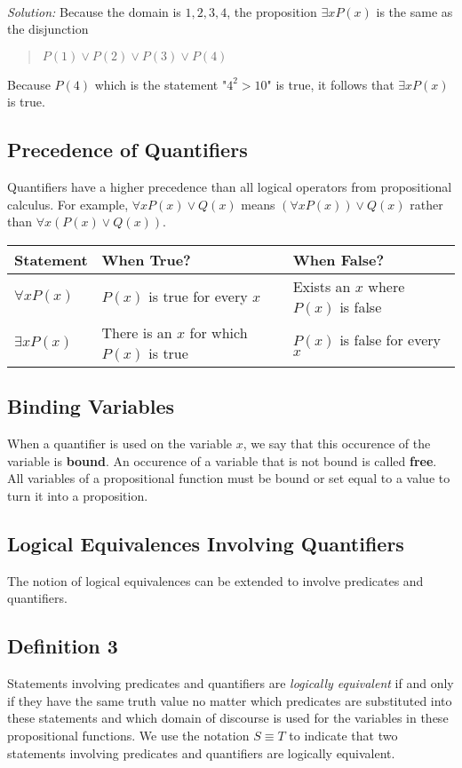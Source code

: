 \documentclass{article}
\begin{document}
\noindent \\ \textit{Solution:} Because the domain is ${1,2,3,4}$, the proposition $\exists xP(x)$ is the same as the disjunction
\begin{quote}
	$P(1) \vee P(2) \vee P(3) \vee P(4)$
\end{quote}

\noindent Because $P(4)$ which is the statement "$4^2 > 10$" is true, it follows that $\exists xP(x)$ is true.

\subsection*{Precedence of Quantifiers}
Quantifiers have a higher precedence than all logical operators from propositional calculus. For example, $\forall xP(x) \vee Q(x)$ means
$(\forall xP(x)) \vee Q(x)$ rather than $\forall x(P(x) \vee Q(x))$.

\begin{center}
	\begin{tabular}{|l|l|l|}
		\hline
		Statement       & When True?                               & When False?                         \\
		\hline
		$\forall xP(x)$ & $P(x)$ is true for every $x$             & Exists an $x$ where $P(x)$ is false \\
		\hline
		$\exists xP(x)$ & There is an $x$ for which $P(x)$ is true & $P(x)$ is false for every $x$       \\
		\hline
	\end{tabular}
\end{center}

\subsection{Binding Variables}
When a quantifier is used on the variable $x$, we say that this occurence of the variable is \textbf{bound}.
An occurence of a variable that is not bound is called \textbf{free}. All variables of a propositional function must be
bound or set equal to a value to turn it into a proposition.

\subsection{Logical Equivalences Involving Quantifiers}
The notion of logical equivalences can be extended to involve predicates and quantifiers.
\subsection*{Definition 3}
Statements involving predicates and quantifiers are \textit{logically equivalent} if and only if they have the same truth value
no matter which predicates are substituted into these statements and which domain of discourse is used for the variables in these propositional functions.
We use the notation $S \equiv T$ to indicate that two statements involving predicates and quantifiers are logically equivalent.
\end{document}
